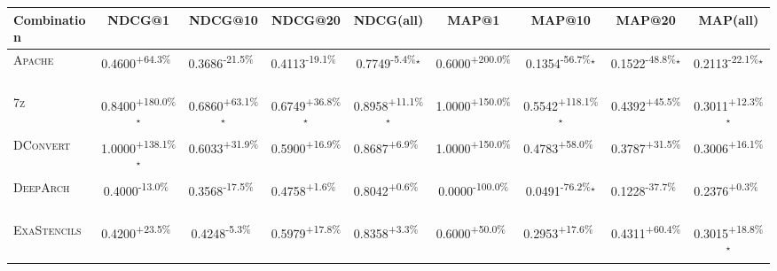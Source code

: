 \begin{table}[htbp]
\centering
\renewcommand{\arraystretch}{1.2}
\begin{tabular}{l|cccc|cccc}
\hline
Combination & NDCG@1 & NDCG@10 & NDCG@20 & NDCG(all) & MAP@1 & MAP@10 & MAP@20 & MAP(all) \\ \hline
\textsc{Apache} & \cellcolor{green!30}0.4600\textsuperscript{+64.3\%}$^{\,\,\,}$ & \cellcolor{red!30}0.3686\textsuperscript{-21.5\%}$^{\,\,\,}$ & \cellcolor{red!30}0.4113\textsuperscript{-19.1\%}$^{\,\,\,}$ & \cellcolor{red!30}0.7749\textsuperscript{-5.4\%}$^\star$ & \cellcolor{green!30}0.6000\textsuperscript{+200.0\%}$^{\,\,\,}$ & \cellcolor{red!30}0.1354\textsuperscript{-56.7\%}$^\star$ & \cellcolor{red!30}0.1522\textsuperscript{-48.8\%}$^\star$ & \cellcolor{red!30}0.2113\textsuperscript{-22.1\%}$^\star$ \\
\textsc{7z} & \cellcolor{green!30}0.8400\textsuperscript{+180.0\%}$^\star$ & \cellcolor{green!30}0.6860\textsuperscript{+63.1\%}$^\star$ & \cellcolor{green!30}0.6749\textsuperscript{+36.8\%}$^\star$ & \cellcolor{green!30}0.8958\textsuperscript{+11.1\%}$^\star$ & \cellcolor{green!30}1.0000\textsuperscript{+150.0\%}$^{\,\,\,}$ & \cellcolor{green!30}0.5542\textsuperscript{+118.1\%}$^\star$ & \cellcolor{green!30}0.4392\textsuperscript{+45.5\%}$^{\,\,\,}$ & \cellcolor{green!30}0.3011\textsuperscript{+12.3\%}$^\star$ \\
\textsc{DConvert} & \cellcolor{green!30}1.0000\textsuperscript{+138.1\%}$^\star$ & \cellcolor{green!30}0.6033\textsuperscript{+31.9\%}$^{\,\,\,}$ & \cellcolor{green!30}0.5900\textsuperscript{+16.9\%}$^{\,\,\,}$ & \cellcolor{green!30}0.8687\textsuperscript{+6.9\%}$^{\,\,\,}$ & \cellcolor{green!30}1.0000\textsuperscript{+150.0\%}$^{\,\,\,}$ & \cellcolor{green!30}0.4783\textsuperscript{+58.0\%}$^{\,\,\,}$ & \cellcolor{green!30}0.3787\textsuperscript{+31.5\%}$^{\,\,\,}$ & \cellcolor{green!30}0.3006\textsuperscript{+16.1\%}$^{\,\,\,}$ \\
\textsc{DeepArch} & \cellcolor{red!30}0.4000\textsuperscript{-13.0\%}$^{\,\,\,}$ & \cellcolor{red!30}0.3568\textsuperscript{-17.5\%}$^{\,\,\,}$ & \cellcolor{green!30}0.4758\textsuperscript{+1.6\%}$^{\,\,\,}$ & \cellcolor{green!30}0.8042\textsuperscript{+0.6\%}$^{\,\,\,}$ & \cellcolor{red!30}0.0000\textsuperscript{-100.0\%}$^{\,\,\,}$ & \cellcolor{red!30}0.0491\textsuperscript{-76.2\%}$^\star$ & \cellcolor{red!30}0.1228\textsuperscript{-37.7\%}$^{\,\,\,}$ & \cellcolor{green!30}0.2376\textsuperscript{+0.3\%}$^{\,\,\,}$ \\
\textsc{ExaStencils} & \cellcolor{green!30}0.4200\textsuperscript{+23.5\%}$^{\,\,\,}$ & \cellcolor{red!30}0.4248\textsuperscript{-5.3\%}$^{\,\,\,}$ & \cellcolor{green!30}0.5979\textsuperscript{+17.8\%}$^{\,\,\,}$ & \cellcolor{green!30}0.8358\textsuperscript{+3.3\%}$^{\,\,\,}$ & \cellcolor{green!30}0.6000\textsuperscript{+50.0\%}$^{\,\,\,}$ & \cellcolor{green!30}0.2953\textsuperscript{+17.6\%}$^{\,\,\,}$ & \cellcolor{green!30}0.4311\textsuperscript{+60.4\%}$^{\,\,\,}$ & \cellcolor{green!30}0.3015\textsuperscript{+18.8\%}$^\star$ \\

\end{tabular}
\end{table}
